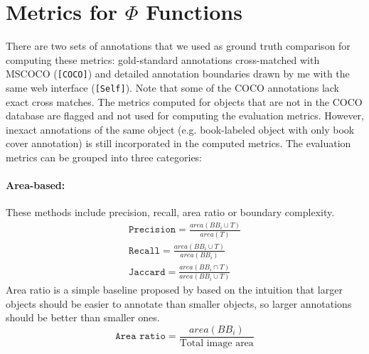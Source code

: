 \documentclass[12pt]{article}
\begin{document}
\section{Metrics for $\Phi$ Functions}
\par There are two sets of annotations that we used as ground truth comparison for computing these metrics: gold-standard annotations cross-matched with MSCOCO (\texttt{[COCO]}) and detailed annotation boundaries drawn by me with the same web interface (\texttt{[Self]}). Note that some of the COCO annotations lack exact cross matches. The metrics computed for objects that are not in the COCO database are flagged and not used for computing the evaluation metrics. However, inexact annotations of the same object (e.g. book-labeled object with only book cover annotation) is still incorporated in the computed metrics. The evaluation metrics can be grouped into three categories: 
\paragraph{Area-based: } These methods include precision, recall, area ratio or boundary complexity. 
\begin{align}
\texttt{Precision} = \frac{area(BB_i\cup T)}{area(T)} \\
\texttt{Recall} = \frac{area(BB_i\cup T)}{area(BB_i)} \\
\texttt{Jaccard} = \frac{area(BB_i\cap T)}{area(BB_i \cup T)}
\end{align}
Area ratio is a simple baseline proposed by  \cite{Vittayakorn2011} based on the intuition that larger objects should be easier to annotate than smaller objects, so larger annotations should be better than smaller ones.
\begin{equation}
\texttt{Area ratio}=\frac{area(BB_i)}{\text{Total image area}}
\end{equation}
\end{document}
